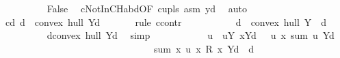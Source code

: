 \begin{isabellebody}
\ \ \ \ \ \ \ \ \isamarkupfalse%
\ False\ \isamarkupfalse%
\ cNotInCHabd{\isacharbrackleft}{\kern0pt}OF\ cup{\isacharunderscore}{\kern0pt}ls{\isacharbrackright}{\kern0pt}\ asm\ y{\isacharunderscore}{\kern0pt}d\ \isamarkupfalse%
\ auto\isanewline
\ \ \ \ \ \ \isamarkupfalse%
\isanewline
\ \ \ \ \ \ \isamarkupfalse%
\ cd{\isacharcolon}{\kern0pt}{\isachardoublequoteopen}{\isasymnot}\ d\ {\isasymin}\ convex\ hull\ {\isacharparenleft}{\kern0pt}Y{\isacharminus}{\kern0pt}{\isacharbraceleft}{\kern0pt}d{\isacharbraceright}{\kern0pt}{\isacharparenright}{\kern0pt}{\isachardoublequoteclose}\isanewline
\ \ \ \ \ \ \isamarkupfalse%
{\isacharparenleft}{\kern0pt}rule\ ccontr{\isacharparenright}{\kern0pt}\isanewline
\ \ \ \ \ \ \ \ \isamarkupfalse%
\ {\isachardoublequoteopen}{\isasymnot}\ d\ {\isasymnotin}\ convex\ hull\ {\isacharparenleft}{\kern0pt}Y\ {\isacharminus}{\kern0pt}\ {\isacharbraceleft}{\kern0pt}d{\isacharbraceright}{\kern0pt}{\isacharparenright}{\kern0pt}{\isachardoublequoteclose}\isanewline
\ \ \ \ \ \ \ \ \isamarkupfalse%
\ {\isachardoublequoteopen}d{\isasymin}convex\ hull\ {\isacharparenleft}{\kern0pt}Y{\isacharminus}{\kern0pt}{\isacharbraceleft}{\kern0pt}d{\isacharbraceright}{\kern0pt}{\isacharparenright}{\kern0pt}{\isachardoublequoteclose}\ \isamarkupfalse%
\ simp\isanewline
\ \ \ \ \ \ \ \ \isamarkupfalse%
\ \isamarkupfalse%
\ u\ \ uY{\isacharcolon}{\kern0pt}\ {\isachardoublequoteopen}{\isacharparenleft}{\kern0pt}{\isasymforall}x{\isasymin}{\isacharparenleft}{\kern0pt}Y{\isacharminus}{\kern0pt}{\isacharbraceleft}{\kern0pt}d{\isacharbraceright}{\kern0pt}{\isacharparenright}{\kern0pt}{\isachardot}{\kern0pt}\ {}\ {\isacharless}{\kern0pt}\ u\ x{\isacharparenright}{\kern0pt}{\isachardoublequoteclose}\ {\isachardoublequoteopen}sum\ u\ {\isacharparenleft}{\kern0pt}Y{\isacharminus}{\kern0pt}{\isacharbraceleft}{\kern0pt}d{\isacharbraceright}{\kern0pt}{\isacharparenright}{\kern0pt}\ {\isacharequal}{\kern0pt}\ {}{\isachardoublequoteclose}\isanewline
\ \ \ \ \ \ \ \ \ \ \ \ \ \ \ \ \ \ \ \ \ \ \ \ \ \ \ \ \ \ \ \ {\isachardoublequoteopen}sum\ {\isacharparenleft}{\kern0pt}{\isasymlambda}x{\isachardot}{\kern0pt}\ u\ x\ {\isacharasterisk}{\kern0pt}\isactrlsub R\ x{\isacharparenright}{\kern0pt}\ {\isacharparenleft}{\kern0pt}Y{\isacharminus}{\kern0pt}{\isacharbraceleft}{\kern0pt}d{\isacharbraceright}{\kern0pt}{\isacharparenright}{\kern0pt}\ {\isacharequal}{\kern0pt}\ d{\isachardoublequoteclose}\isanewline

\end{isabellebody}
